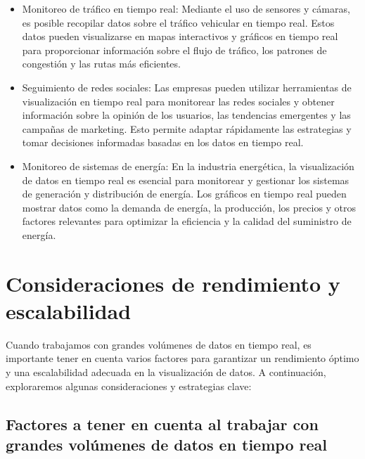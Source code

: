 \documentclass[
  a4paper,
]{article}
\begin{document}
\begin{itemize}
\item
  Monitoreo de tráfico en tiempo real: Mediante el uso de sensores y
  cámaras, es posible recopilar datos sobre el tráfico vehicular en
  tiempo real. Estos datos pueden visualizarse en mapas interactivos y
  gráficos en tiempo real para proporcionar información sobre el flujo
  de tráfico, los patrones de congestión y las rutas más eficientes.
\item
  Seguimiento de redes sociales: Las empresas pueden utilizar
  herramientas de visualización en tiempo real para monitorear las redes
  sociales y obtener información sobre la opinión de los usuarios, las
  tendencias emergentes y las campañas de marketing. Esto permite
  adaptar rápidamente las estrategias y tomar decisiones informadas
  basadas en los datos en tiempo real.
\item
  Monitoreo de sistemas de energía: En la industria energética, la
  visualización de datos en tiempo real es esencial para monitorear y
  gestionar los sistemas de generación y distribución de energía. Los
  gráficos en tiempo real pueden mostrar datos como la demanda de
  energía, la producción, los precios y otros factores relevantes para
  optimizar la eficiencia y la calidad del suministro de energía.
\end{itemize}

\hypertarget{consideraciones-de-rendimiento-y-escalabilidad}{%
\section{Consideraciones de rendimiento y
escalabilidad}\label{consideraciones-de-rendimiento-y-escalabilidad}}

Cuando trabajamos con grandes volúmenes de datos en tiempo real, es
importante tener en cuenta varios factores para garantizar un
rendimiento óptimo y una escalabilidad adecuada en la visualización de
datos. A continuación, exploraremos algunas consideraciones y
estrategias clave:

\hypertarget{factores-a-tener-en-cuenta-al-trabajar-con-grandes-voluxfamenes-de-datos-en-tiempo-real}{%
\subsection{Factores a tener en cuenta al trabajar con grandes volúmenes
de datos en tiempo
real}\label{factores-a-tener-en-cuenta-al-trabajar-con-grandes-voluxfamenes-de-datos-en-tiempo-real}}
\end{document}
